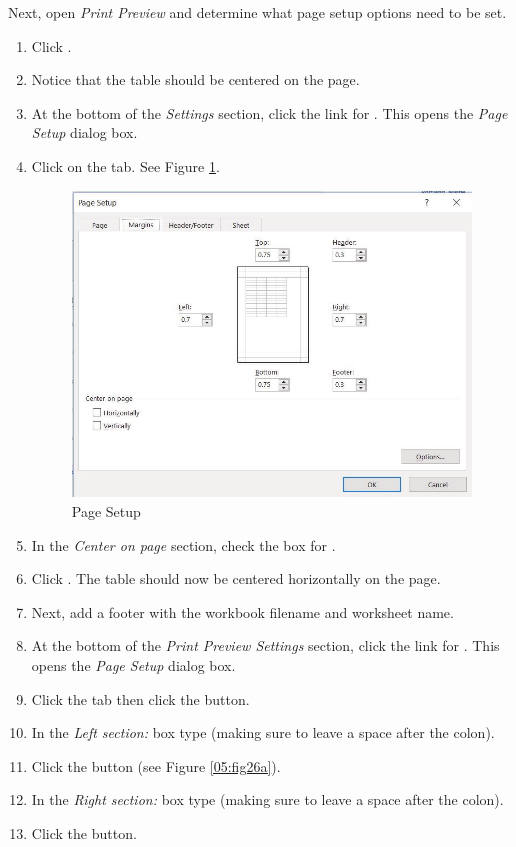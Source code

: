 Next, open \textit{Print Preview} and determine what page setup options need to be set.

\begin{enumbox}
	\begin{enumerate}
		\item Click .
		\item Notice that the table should be centered on the page.
		\item At the bottom of the \textit{Settings} section, click the link for . This opens the \textit{Page Setup} dialog box. 
		\item Click on the  tab. See Figure \ref{05:fig26}.
	
		\begin{figure}[H]
			\centering
			\includegraphics[width=\maxwidth{.95\linewidth}]{gfx/ch05_fig26}
			\caption{Page Setup}
			\label{05:fig26}
		\end{figure}

		\item In the \textit{Center on page} section, check the box for .
		\item Click . The table should now be centered horizontally on the page.
		\item Next, add a footer with the workbook filename and worksheet name.
		\item At the bottom of the \textit{Print Preview Settings} section, click the link for . This opens the \textit{Page Setup} dialog box.	
		\item Click the  tab then click the  button.
		\item In the \textit{Left section:} box type  (making sure to leave a space after the colon).
		\item Click the  button (see Figure \ref{05:fig26a}).
		\item In the \textit{Right section:} box type  (making sure to leave a space after the colon).
		\item Click the  button.
		

\end{enumerate}
\end{enumbox}
